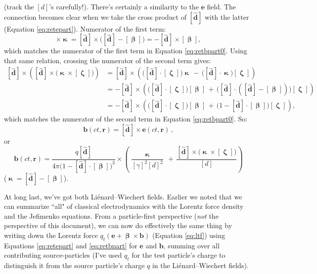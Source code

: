 \documentclass[12pt]{article}
\renewcommand{\vv}[1]{\mathbf{#1}}
\newcommand{\vvbeta}{\bm{\upbeta}}
\newcommand{\vvzeta}{\bm{\upzeta}}
\begin{document}
(track the $[d]$'s carefully!). There's certainly a similarity to the $\vv e$ field. The connection becomes clear when we take the cross product of $[\vv{\hat{d}}]$ with the latter (Equation \ref{eq:retepart}). Numerator of the first term:
\begin{equation*}
[\vv{\hat{d}}] \times \vv{\upkappa} =  [\vv{\hat{d}}] \times \big( [\vv{\hat{d}}] - [\vvbeta] \big) = - [\vv{\hat{d}}] \times [\vvbeta] ,
\end{equation*}
which matches the numerator of the first term in Equation \ref{eq:retbpart0}. Using that same relation, crossing the numerator of the second term gives:
\begin{equation*}
\begin{split}
[\vv{\hat{d}}] \times \left( [\vv{\hat{d}}] \times \big( \vv{\upkappa} \times [\vvzeta] \big) \right) &= [\vv{\hat{d}}] \times \left( \big([\vv{\hat{d}}] \cdot [\vvzeta] \big) \vv{\upkappa} \, - \, \big( [\vv{\hat{d}}] \cdot \vv{\upkappa} \big) [\vvzeta] \right) \\
&= - [\vv{\hat{d}}] \times \left( \big([\vv{\hat{d}}] \cdot [\vvzeta] \big) [\vvbeta] \, + \, \big( [\vv{\hat{d}}] \cdot ( [\vv{\hat{d}}] - [\vvbeta] ) \big) [\vvzeta] \right) \\
&= - [\vv{\hat{d}}] \times \left( \big([\vv{\hat{d}}] \cdot [\vvzeta] \big) [\vvbeta] \, + \, \big(1 - [\vv{\hat{d}}] \cdot [\vvbeta] \big) [\vvzeta] \right) ,
\end{split}
\end{equation*}
which matches the numerator of the second term in Equation \ref{eq:retbpart0}. So:
\begin{equation}\label{eq:retbpart}
\boxed{ \vv b (ct, \vv r) = [\vv{\hat{d}}] \times \vv e (ct, \vv r) } \, ,
\end{equation}
or
\begin{equation}\label{eq:retbpart2}
\boxed{ \vv b (ct, \vv r) = \dfrac{q [\vv{\hat{d}}]}{4 \pi \big( 1 - [\vv{\hat{d}}] \cdot [\vvbeta] \big)^3} \times \left( \dfrac{\vv{\upkappa}}{[\gamma]^2 [d]^2} \, + \, \dfrac{[\vv{\hat{d}}] \times \big( \vv{\upkappa} \times [\vvzeta] \big)}{[d]} \right) }
\end{equation}
($\vv{\upkappa} = [\vv{\hat{d}}] - [\vvbeta]$).

At long last, we've got both Li\'enard--Wiechert fields. Earlier we noted that we can summarize ``all" of classical electrodynamics with the Lorentz force density and the Jefimenko equations. From a particle-first perspective (\emph{not} the perspective of this document), we can now do effectively the same thing by writing down the Lorentz force $q_t ( \vv e + \vvbeta \times \vv b )$ (Equation \ref{eq:ltf}) using Equations \ref{eq:retepart} and \ref{eq:retbpart} for $\vv e$ and $\vv b$, summing over all contributing source-particles (I've used $q_t$ for the test particle's charge to distinguish it from the source particle's charge $q$ in the Li\'enard--Wiechert fields).
\end{document}
